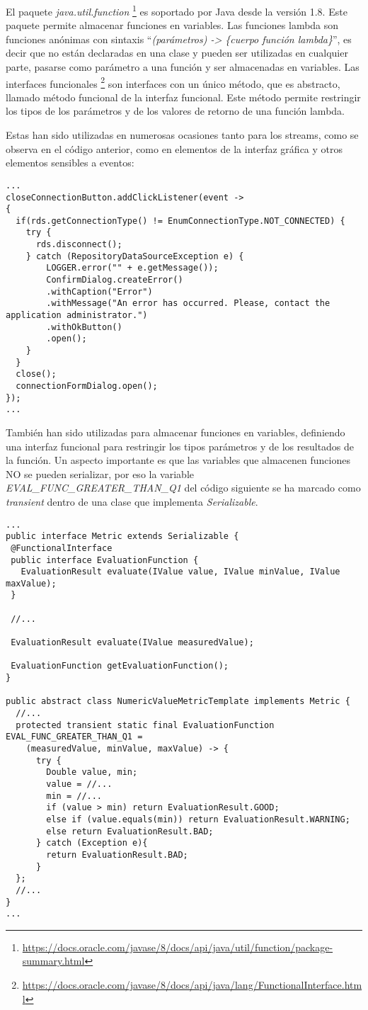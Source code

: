 El paquete \textit{java.util.function} \footnote{\url{https://docs.oracle.com/javase/8/docs/api/java/util/function/package-summary.html}} es soportado por Java desde la versión 1.8. Este paquete permite almacenar funciones en variables. Las funciones lambda son funciones anónimas con sintaxis ``\textit{(parámetros) -> \{cuerpo función lambda\}}'', es decir que no están declaradas en una clase y pueden ser utilizadas en cualquier parte, pasarse como parámetro a una función y ser almacenadas en variables. Las interfaces funcionales \footnote{\url{https://docs.oracle.com/javase/8/docs/api/java/lang/FunctionalInterface.html}} son interfaces con un único método, que es abstracto, llamado método funcional de la interfaz funcional. Este método permite restringir los tipos de los parámetros y de los valores de retorno de una función lambda.

Estas han sido utilizadas en numerosas ocasiones tanto para los streams, como se observa en el código anterior, como en elementos de la interfaz gráfica y otros elementos sensibles a eventos:

{\tiny 
\begin{lstlisting}
...
closeConnectionButton.addClickListener(event ->  
{
  if(rds.getConnectionType() != EnumConnectionType.NOT_CONNECTED) {
	try {
	  rds.disconnect();
	} catch (RepositoryDataSourceException e) {
		LOGGER.error("" + e.getMessage());
		ConfirmDialog.createError()
		.withCaption("Error")
		.withMessage("An error has occurred. Please, contact the application administrator.")
		.withOkButton()
		.open();
	}
  }
  close();
  connectionFormDialog.open();
});
...
\end{lstlisting}
}

También han sido utilizadas para almacenar funciones en variables, definiendo una interfaz funcional para restringir los tipos parámetros y de los resultados de la función. Un aspecto importante es que las variables que almacenen funciones NO se pueden serializar, por eso la variable \textit{EVAL\_FUNC\_GREATER\_THAN\_Q1} del código siguiente se ha marcado como \textit{transient} dentro de una clase que implementa \textit{Serializable}.

{\tiny 
\begin{lstlisting}
...
public interface Metric extends Serializable {
 @FunctionalInterface
 public interface EvaluationFunction {
   EvaluationResult evaluate(IValue value, IValue minValue, IValue maxValue);
 }

 //...
 
 EvaluationResult evaluate(IValue measuredValue);

 EvaluationFunction getEvaluationFunction();
}

public abstract class NumericValueMetricTemplate implements Metric {
  //...
  protected transient static final EvaluationFunction EVAL_FUNC_GREATER_THAN_Q1 = 
    (measuredValue, minValue, maxValue) -> {
      try {
        Double value, min;
	    value = //...
	    min = //...
	    if (value > min) return EvaluationResult.GOOD;
	    else if (value.equals(min)) return EvaluationResult.WARNING;
	    else return EvaluationResult.BAD;
	  } catch (Exception e){
	    return EvaluationResult.BAD;
	  }
  };
  //...
}
...
\end{lstlisting}
}

